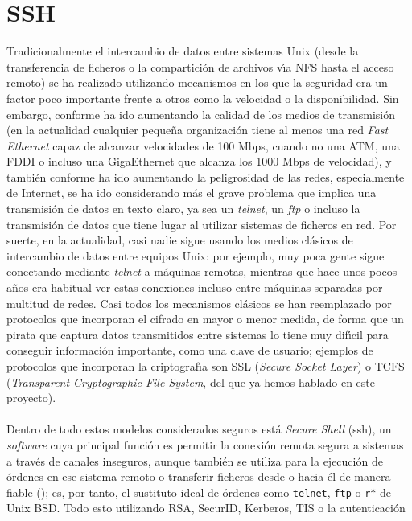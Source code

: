 \section{SSH}
Tradicionalmente el intercambio de datos entre sistemas Unix (desde la 
transferencia de ficheros o la compartici\'on de archivos v\'{\i}a NFS hasta el
acceso remoto) se ha realizado utilizando mecanismos en los que la seguridad 
era un factor poco importante frente a otros como la velocidad o la 
disponibilidad. Sin embargo, conforme ha ido aumentando 
la calidad de los medios de transmisi\'on (en la actualidad cualquier peque\~na
organizaci\'on tiene al menos una red {\it Fast Ethernet} capaz de alcanzar 
velocidades de 100 Mbps, cuando no una ATM, una FDDI o incluso una GigaEthernet
que alcanza los 1000 Mbps de velocidad), y tambi\'en conforme ha ido aumentando
la peligrosidad de las redes, especialmente de Internet, se ha ido considerando
m\'as el grave problema que implica una transmisi\'on de datos en texto claro,
ya sea un {\it telnet}, un {\it ftp} o incluso la transmisi\'on de datos que
tiene lugar al utilizar sistemas de ficheros en red. Por suerte, en la 
actualidad, casi nadie sigue usando los medios cl\'asicos de intercambio de 
datos entre equipos Unix: por ejemplo, muy poca gente sigue conectando mediante 
{\it telnet} a m\'aquinas remotas, mientras que hace unos pocos a\~nos era
habitual ver estas conexiones incluso entre m\'aquinas separadas por multitud
de redes. Casi todos los mecanismos cl\'asicos se han reemplazado por 
protocolos que incorporan el cifrado en mayor o menor medida, de forma que 
un pirata que captura datos transmitidos entre sistemas lo tiene muy 
dif\'{\i}cil para conseguir informaci\'on importante, como una clave de 
usuario; ejemplos de protocolos que incorporan la criptograf\'{\i}a son SSL 
({\it Secure Socket Layer}) o TCFS ({\it Transparent Cryptographic File 
System}, del que ya hemos hablado en este proyecto).\\
\\Dentro de todo estos modelos considerados seguros est\'a {\it Secure Shell} 
({\sc ssh}), un {\it software} cuya principal funci\'on es permitir la 
conexi\'on remota segura a sistemas a trav\'es de canales inseguros, aunque 
tambi\'en se utiliza para la ejecuci\'on de \'ordenes en ese sistema remoto o 
transferir ficheros desde o hacia \'el de manera fiable (\cite{kn:ylo96}); es, 
por tanto, el 
sustituto ideal de \'ordenes como {\tt telnet}, {\tt ftp} o {\tt r$\ast$} de 
Unix BSD. Todo esto utilizando RSA, SecurID, Kerberos, TIS o la autenticaci\'on 
